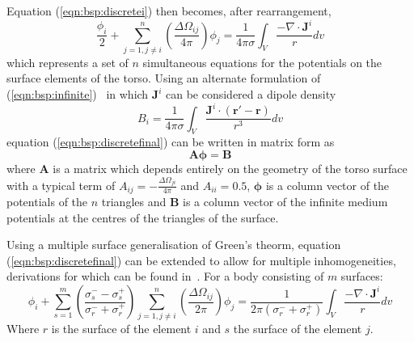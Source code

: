 Equation (\ref{eqn:bsp:discretei}) then becomes, after rearrangement,
\begin{equation}
\label{eqn:bsp:discretefinal}
\frac{\phi_{i}}{2} + \sum_{j=1,j \neq i}^n \left(\frac{\Delta\Omega_{ij}}{4\pi} \right)\phi_{j} =
\frac{1}{4 \pi \sigma}\int_{V} \frac{-\nabla \cdot \mathbf{J}^{i}}{r}dv
\end{equation}
which represents a set of $n$ simultaneous equations for the potentials on the
surface elements of the torso.
Using an alternate formulation of (\ref{eqn:bsp:infinite})~\cite{Plonsey1989} in
which $\mathbf{J}^i$ can be considered a dipole density
\begin{equation}
\label{eqn:bsp:b}
B_i = \frac{1}{4 \pi \sigma}\int_{V} \frac{\mathbf{J}^{i}\cdot
\left(\mathbf{r'}-\mathbf{r}\right)}{r^3}dv
\end{equation}
equation (\ref{eqn:bsp:discretefinal}) can be written in matrix form as
\begin{equation}
\label{eqn:bsp:matrix}
\mathbf{A}\mathbf{\phi} = \mathbf{B}
\end{equation}
where $\mathbf{A}$ is a matrix which depends entirely on the geometry of the
torso surface with a typical term of $\displaystyle A_{ij} =
-\frac{\Delta\Omega_{ji}}{4\pi}$ and $A_{ii} = 0.5$, $\mathbf{\phi}$ is a column
vector of the potentials of the $n$ triangles and $\mathbf{B}$ is a column
vector of the infinite medium potentials at the centres of the triangles of the
surface.

Using a multiple surface generalisation of Green's theorm, equation
(\ref{eqn:bsp:discretefinal}) can be extended  to allow for multiple
inhomogeneities, derivations for which can be found
in~\cite{Barr1966,Gulrajani1983,Gulrajani1989}.
For a body consisting of $m$ surfaces:
\begin{equation}
\label{eqn:bsp:multiple}
\phi_{i} + \sum_{s = 1}^{m} \left(\frac{\sigma^{-}_{s} - \sigma^{+}_{s} }{\sigma^{-}_{r} + \sigma^{+}_{r} }\right)
    \sum_{j=1,j \neq i}^n \left( \frac{\Delta\Omega_{ij}}{2\pi} \right)\phi_{j} =
\frac{1}{2 \pi \left(\sigma^{-}_{r} + \sigma^{+}_{r}\right)}\int_{V} \frac{-\nabla \cdot \mathbf{J}^{i}}{r}dv
\end{equation}
Where $r$ is the surface of the element $i$ and $s$ the surface of the element
$j$.

